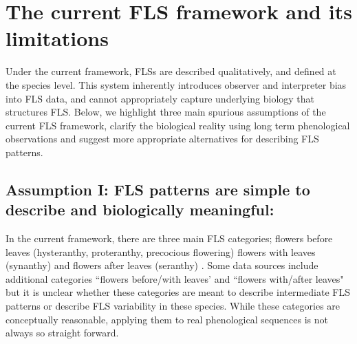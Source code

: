 \documentclass{article}
\begin{document}
\section*{The current FLS framework and its limitations}
Under the current framework, FLSs are described qualitatively, and defined at the species level. This system inherently introduces observer and interpreter bias into FLS data, and cannot appropriately capture underlying biology that structures FLS. Below, we highlight three main spurious assumptions of the current FLS framework,  clarify the biological reality using long term phenological observations and suggest more appropriate alternatives for describing FLS patterns.
\subsection*{Assumption I: FLS patterns are simple to describe and biologically meaningful:}
In the current framework, there are three main FLS categories; flowers before leaves (hysteranthy, proteranthy, precocious flowering) flowers with leaves (synanthy) and flowers after leaves (seranthy) \citep{Lamont2011, Heinig1899}. Some data sources \citep[e.g.][]{Burns1990,Barnes2004} include additional categories ``flowers before/with leaves' and ``flowers with/after leaves" but it is unclear whether these categories are meant to describe intermediate FLS patterns or describe FLS variability in these species. While these categories are conceptually reasonable, applying them to real phenological sequences is not always so straight forward.
\end{document}
